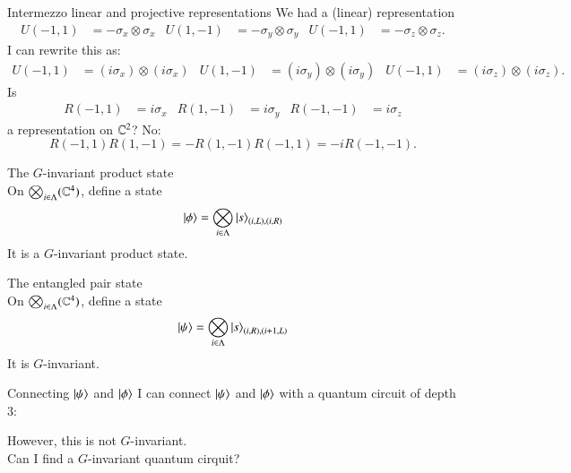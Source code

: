 \documentclass{beamer}
\begin{document}
\begin{frame}{Intermezzo linear and projective representations}
	We had a (linear) representation
	\begin{align*}
			U(-1,1)&=-\sigma_x\otimes \sigma_x&U(1,-1)&=-\sigma_y\otimes \sigma_y&U(-1,1)&=-\sigma_z\otimes \sigma_z.
	\end{align*}
	\pause
	I can rewrite this as:\\
	\begin{align*}
	U(-1,1)&=(i\sigma_x)\otimes (i\sigma_x)&U(1,-1)&=(i\sigma_y)\otimes (i\sigma_y)&U(-1,1)&=(i\sigma_z)\otimes (i\sigma_z).
	\end{align*}
	\pause
	Is
	\begin{align*}
		R(-1,1)&=i\sigma_x&R(1,-1)&=i\sigma_y&R(-1,-1)&=i\sigma_z
	\end{align*}
	 a representation on $\mathbb{C}^2$? \pause No:
	\begin{equation*}
		R(-1,1)R(1,-1)=-R(1,-1)R(-1,1)=-i R(-1,-1).
	\end{equation*}
\end{frame}

\begin{frame}{The $G$-invariant product state}
	\\
	On $\bigotimes_{i\in\Lambda}(\mathbb{C}^4)$, define a state
	\begin{equation*}
		\ket{\phi}=\bigotimes_{i\in\Lambda}\ket{s}_{(i,L),(i,R)}
	\end{equation*}
	\pause
	It is a $G$-invariant product state.
\end{frame}

\begin{frame}{The entangled pair state}
	\\
	On $\bigotimes_{i\in\Lambda}(\mathbb{C}^4)$, define a state
	\begin{equation*}
		\ket{\psi}=\bigotimes_{i\in\Lambda}\ket{s}_{(i,R),(i+1,L)}
	\end{equation*}
	\pause
	It is $G$-invariant.
\end{frame}


\begin{frame}{Connecting $\ket{\psi}$ and $\ket{\phi}$}
	I can connect $\ket{\psi}$ and $\ket{\phi}$ with a quantum circuit of depth 3:
	\begin{center}
		\scalebox{0.75}{
		
		}
	\end{center}
	\pause
	However, this is not $G$-invariant.\\
	\pause
	Can I find a $G$-invariant quantum cirquit?
\end{frame}
\end{document}
